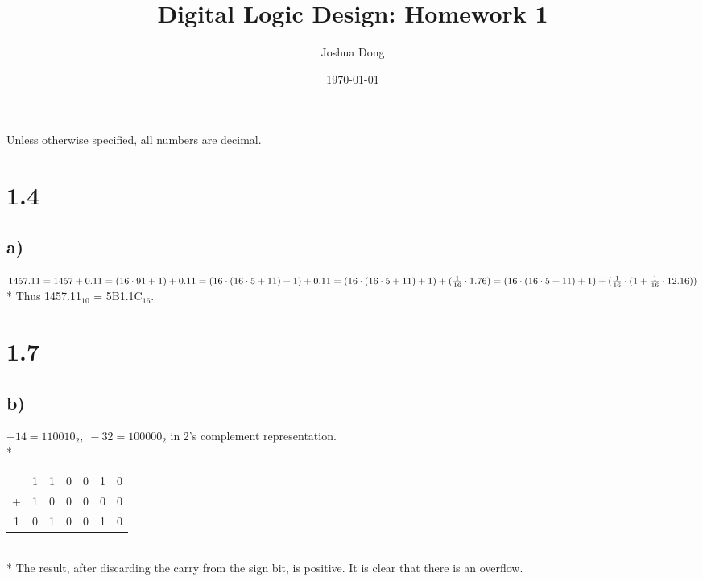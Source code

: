 \documentclass{article}
\begin{document}
\title{Digital Logic Design: Homework 1}
\author{Joshua Dong}
\date{\today}
\maketitle

Unless otherwise specified, all numbers are decimal.

\section{1.4}
\subsection{a)}
$1457.11
\\*
= 1457 + 0.11
\\*
= (16 \cdot 91 + 1) + 0.11
\\*
= (16 \cdot (16 \cdot 5 + 11) + 1) + 0.11
\\*
= (16 \cdot (16 \cdot 5 + 11) + 1) +
    (\frac{1}{16} \cdot 1.76)
\\*
= (16 \cdot (16 \cdot 5 + 11) + 1) +
    (\frac{1}{16} \cdot (1 + \frac{1}{16} \cdot 12.16))$
\\*
Thus 1457.11$_{10}$ = 5B1.1C$_{16}$.

\section{1.7}
\subsection{b)}
$-14 = 110010_2,\; -32 = 100000_2$ in 2's complement representation.
\\*
\begin{tabular}{c@{\,}c@{\,}c@{\,}c@{\,}c@{\,}c@{\,}c}
  &1&1&0&0&1&0 \\
+ &1&0&0&0&0&0 \\
\hline
 1&0&1&0&0&1&0 \\
\end{tabular}
\\*
The result, after discarding the carry from the sign bit, is positive. It is clear that there is an overflow.
\end{document}
